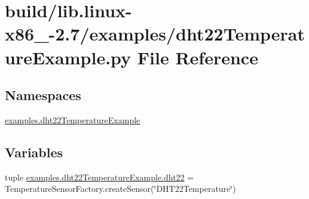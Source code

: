 \hypertarget{build_2lib_8linux-x86__64-2_87_2examples_2dht22TemperatureExample_8py}{}\section{build/lib.linux-\/x86\+\_-\/2.7/examples/dht22\+Temperature\+Example.py File Reference}
\label{build_2lib_8linux-x86__64-2_87_2examples_2dht22TemperatureExample_8py}
\subsection*{Namespaces}
\begin{DoxyCompactItemize}
\item 
 \hyperlink{namespaceexamples_1_1dht22TemperatureExample}{examples.\+dht22\+Temperature\+Example}
\end{DoxyCompactItemize}
\subsection*{Variables}
\begin{DoxyCompactItemize}
\item 
tuple \hyperlink{namespaceexamples_1_1dht22TemperatureExample_a8a7cfaafa6635e944bbb572f9005f5b9}{examples.\+dht22\+Temperature\+Example.\+dht22} = Temperature\+Sensor\+Factory.\+create\+Sensor(\char`\"{}D\+H\+T22\+Temperature\char`\"{})
\end{DoxyCompactItemize}
